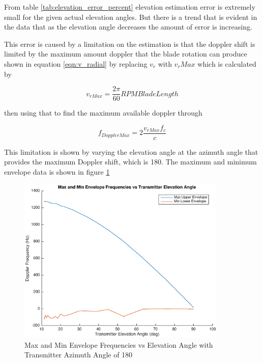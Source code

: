 From table \ref{tab:elevation_error_percent} elevation estimation error is extremely small for the given actual elevation angles. But there is a trend that is evident in the data that as the elevation angle decreases the amount of error is increasing.


This error is caused by a limitation on the estimation is that the doppler shift is limited by the maximum amount doppler that the blade rotation can produce shown in equation \ref{eqn:v_radial} by replacing $v_r$ with $v_rMax$ which is calculated by

\begin{equation}
	v_{rMax} = \frac{2\pi}{60} RPM BladeLength
	\label{eqn:v_radial_max}
\end{equation}

then using that to find the maximum available doppler through

\begin{equation}
	f_{DopplerMax} = 2\frac{v_{rMax} f_c}{c}
	\label{eqn:fd_max}
\end{equation}

This limitation is shown by varying the elevation angle at the azimuth angle that provides the maximum Doppler shift, which is 180\textdegree \space. The maximum and minimum envelope data is shown in figure \ref{fig:envelope_180deg}

\begin{figure}
	\begin{center}
		\includegraphics[width=10cm]{images/results/Elevation_angle_envelopes_180deg_Azimuth.eps}
		\caption{Max and Min Envelope Frequencies vs Elevation Angle with Transmitter Azimuth Angle of 180\textdegree}
		\label{fig:envelope_180deg}
	\end{center}
\end{figure}

